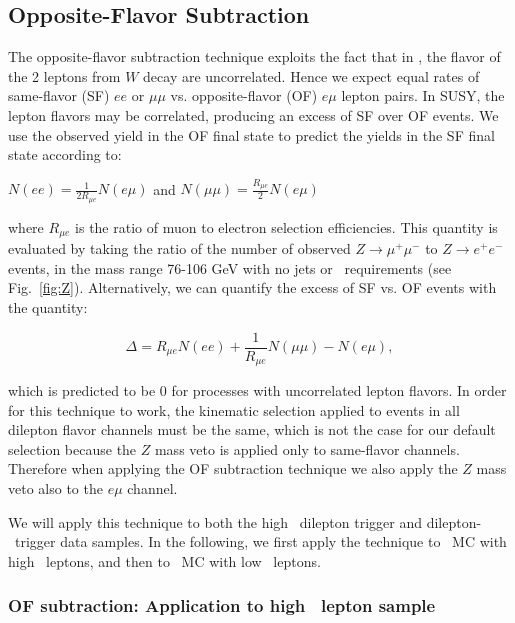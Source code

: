 \clearpage

\subsection{Opposite-Flavor Subtraction}
\label{sec:ofsubtraction}

The opposite-flavor subtraction technique exploits the fact that in \ttbar, the flavor
of the 2 leptons from $W$ decay are uncorrelated. Hence we expect equal rates of same-flavor (SF) 
$ee$ or $\mu\mu$ vs. opposite-flavor (OF) $e\mu$ lepton pairs. In SUSY, the lepton flavors may be 
correlated, producing an excess of SF over OF events. We use the observed 
yield in the OF final state to predict the yields in the SF final state according to:

\begin{center}
$N(ee)     = \frac{1}{2R_{\mu e}}N(e\mu)$ and $N(\mu\mu) = \frac{R_{\mu e}}{2}N(e\mu)$
\end{center}

where $R_{\mu e}$ is the ratio of muon to electron selection efficiencies.
This quantity is evaluated by taking the ratio of the number of observed
$Z \to \mu^+\mu^-$ to $Z \to e^+e^-$ events, in the mass range 76-106 GeV
with no jets or \met\ requirements (see Fig.~\ref{fig:Z}). Alternatively, we can quantify
the excess of SF vs. OF events with the quantity:

\begin{equation}
\label{eq:ofhighpt}
\Delta = R_{\mu e}N(ee) + \frac{1}{R_{\mu e}}N(\mu\mu) - N(e\mu),
\end{equation}

which is predicted to be 0 for processes with uncorrelated lepton flavors. 
In order
for this technique to work, the kinematic selection applied to events in all dilepton
flavor channels must be the same, which is not the case for our default selection because the
$Z$ mass veto is applied only to same-flavor channels. Therefore when applying the OF
subtraction technique we also apply the $Z$ mass veto also to the $e\mu$ channel. 

We will apply this technique to both the high \pt\ dilepton trigger and dilepton-\Ht\ trigger data samples.
In the following, we first apply the technique to \ttbar\ MC with high \pt\ leptons, and then
to \ttbar\ MC with low \pt\ leptons.

\subsubsection{OF subtraction: Application to high \pt\ lepton sample}

